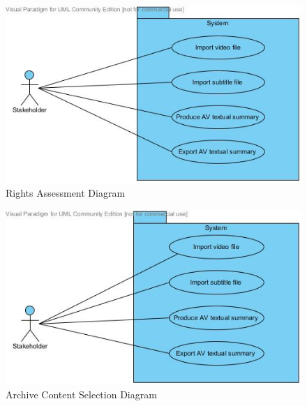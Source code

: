 \newpage
\begin{figure}[ht]
\begin{center}
\includegraphics[trim = 0mm 0mm 0mm 0mm, clip, scale=0.75]{Images/rights_assessment_use_case_diagram.jpg}
\end{center}
\caption{Rights Assessment Diagram}
\end{figure}

\begin{figure}[ht]
\begin{center}
\includegraphics[trim = 0mm 0mm 0mm 0mm, clip, scale=0.75]{Images/archive_content_selection_use_case_diagram.jpg}
\end{center}
\caption{Archive Content Selection Diagram}
\end{figure}
